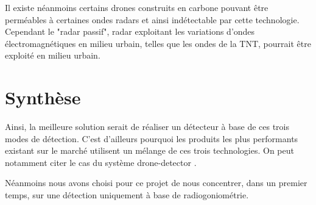 Il existe néanmoins certains drones construits en carbone pouvant être perméables à certaines ondes radars et ainsi indétectable par cette technologie. Cependant le "radar passif", radar exploitant les variations d'ondes électromagnétiques en milieu urbain, telles que les ondes de la TNT, pourrait être exploité en milieu urbain.

\section{Synthèse}

Ainsi, la meilleure solution serait de réaliser un détecteur à base de ces trois modes de détection. C'est d'ailleurs pourquoi les produits les plus performants existant sur le marché utilisent un mélange de ces trois technologies. On peut notamment citer le cas du système drone-detector \cite{dronedetector}.

Néanmoins nous avons choisi pour ce projet de nous concentrer, dans un premier temps, sur une détection uniquement à base de radiogoniométrie.





